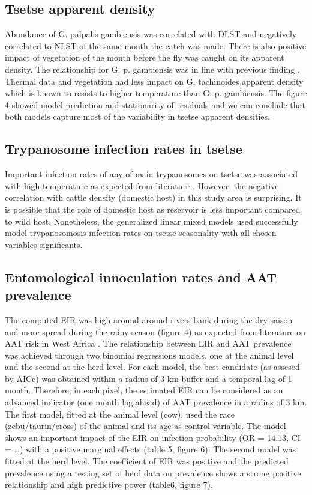 \documentclass[10pt]{article}
\begin{document}
\subsection*{Tsetse apparent density}
\label{unnumbered-16}
Abundance of G. palpalis gambiensis was correlated with DLST and negatively correlated to NLST of the same month the catch was made.
There is also positive impact of vegetation of the month before the fly was caught on its apparent density. 
The relationship for G. p. gambiensis was in line with previous finding \cite{rogers1986distribution}. 
Thermal data and vegetation had less impact on G. tachinoides apparent density which is known to resists to higher temperature 
than G. p. gambiensis. The figure 4 showed model prediction and stationarity of residuals and we can conclude that both models
capture most of the variability in tsetse apparent densities.

\subsection*{Trypanosome infection rates in tsetse}
\label{unnumbered-17}
Important infection rates of any of main trypanosomes on tsetse was associated with high temperature as
expected from literature \cite{bouyer2013dynamics}. However, the negative correlation with cattle density (domestic host) in this study area is 
surprising. It is possible that the role of domestic host as reservoir is less important compared to wild host.
Nonetheless, the generalized linear mixed models used successfully model trypanosomosis infection rates on tsetse seasonality with all chosen variables significants. 

\subsection*{Entomological innoculation rates and AAT prevalence}
\label{unnumbered-18}
The computed EIR was high around around rivers bank during the dry saison and more 
spread during the rainy season (figure 4) as expected from literature on AAT risk in West Africa \cite{michel2002modelling, bouyer2006mapping}. 
The relationship between EIR and AAT prevalence was achieved through two binomial regressions models, one at the animal level and the second at the herd level.
For each model, the best candidate (as assesed by AICc) was obtained within a radius of 3 km buffer and a temporal lag of 1 month. 
Therefore, in each pixel, the estimated EIR can be considered as an advanced indicator (one month lag ahead) of AAT prevalence in a radius of 3 km. 
The first model, fitted at the animal level (cow), used the race (zebu/taurin/cross) of the animal and its age as control variable. 
The model shows an important impact of the EIR on infection probability (OR = 14.13, CI = \ldots{}) with a positive marginal effects (table 5, figure 6).
The second model was fitted at the herd level. The coefficient of EIR was positive and the predicted prevalence using a testing set of herd data on prevalence shows a strong positive relationship and high predictive power (table6, figure 7).
\end{document}
